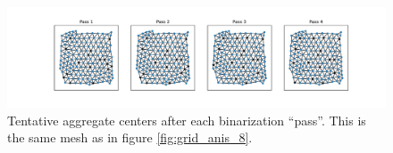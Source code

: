 \documentclass{article}
\begin{document}
\begin{figure}[h]
  \centering
  \includegraphics[width=\textwidth, trim=120 0 100 0, clip]{grid_anis_8_agg_pass.pdf}
  \caption{Tentative aggregate centers after each binarization ``pass''.  This is the same mesh as in figure \ref{fig:grid_anis_8}.}
\end{figure}



\end{document}
